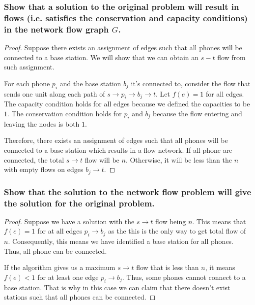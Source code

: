 \documentclass[11pt]{scrartcl}
\begin{document}
\subsubsection{
	Show that a solution to the original problem will result in flows (i.e. satisfies
	the conservation and capacity conditions) in the network flow graph $G$.
}
\begin{proof}
	Suppose there exists an assignment of edges such that all phones will be connected to a base station.
	We will show that we can obtain an $s-t$ flow from such assignment.

	For each phone $p_i$ and the base station $b_j$ it's connected to, consider the flow that sends one unit
	along each path of $s \rightarrow p_i \rightarrow b_j \rightarrow t$. Let $f(e)=1$ for all edges.
	The capacity condition holds for all edges because we defined the capacities to be $1$.
	The conservation condition holds for $p_i$ and $b_j$ because the flow entering and leaving the nodes is both $1$.

	Therefore, there exists an assignment of edges such that all phones will be connected to a base station
	which results in a flow network. If all phone are connected, the total $s \rightarrow t$ flow
	will be $n$. Otherwise, it will be less than the $n$ with empty flows on edges $b_j \rightarrow t$.
\end{proof}


\subsubsection{
	Show that the solution to the network flow problem will give the solution for
	the original problem.
}


\begin{proof}
	Suppose we have a solution with the $s \rightarrow t$ flow being $n$.
	This means that $f(e) = 1$ for at all edges $p_i \rightarrow b_j$ as the this is the only
	way to get total flow of $n$. Consequently, this means we have identified
	a base station for all phones.  Thus, all phone can be connected.

	If the algorithm gives us a maximum $s \rightarrow t$ flow that is less than $n$,
	it means $f(e) < 1$ for at least one edge $p_i \rightarrow b_j$.
	Thus, some phones cannot connect to a base station.
	That is why in this case we can claim that there doesn't exist stations such that
	all phones can be connected.
\end{proof}
\end{document}
